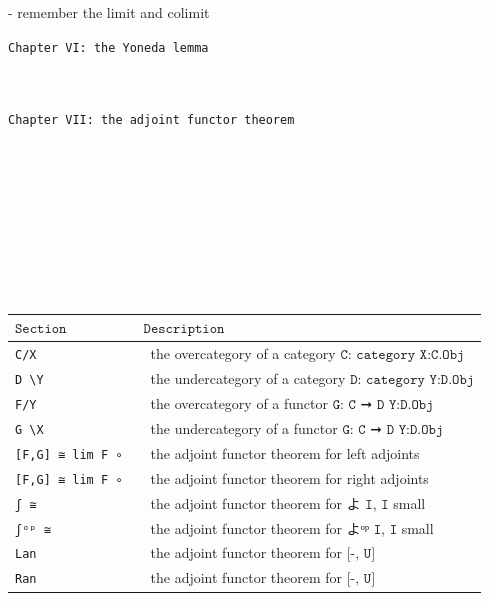 \documentclass{book}
\begin{document}
- remember the limit and colimit


\texttt{Chapter VI: the Yoneda lemma}


\newpage
{
\Huge 
\begin{center}
\ \\
\ \\
\thispagestyle{empty}
\texttt{Chapter VII: the adjoint functor theorem}
\end{center}
}

\ \\
\ \\
\ \\
\ \\
\ \\
\ \\
\ \\
\ \\

{
\small
\begin{center}
\begin{tabular}{|l | l |} 
 \hline
 $\texttt{Section}$ & $\texttt{Description}$ \\
 \hline \hline
 \hline
  \texttt{C/X}  &\ the overcategory of a category $\texttt{C: category}$ $\texttt{X:C.Obj}$\\
 \hline
   \texttt{D \backslash Y}  &\ the undercategory of a category $\texttt{D: category}$ $\texttt{Y:D.Obj}$ \\
 \hline
  \texttt{F/Y}  &\ the overcategory of a functor $\texttt{G: C ➞ D}$ $\texttt{Y:D.Obj}$ \\
 \hline
  \texttt{G \backslash X}  &\ the undercategory of a functor $\texttt{G: C ➞ D}$ $\texttt{Y:D.Obj}$ \\
 \hline
 \texttt{[F,G] ≅ lim F ∘ } &\ the adjoint functor theorem for left adjoints\\
 \hline
 \texttt{[F,G] ≅ lim F ∘ } &\ the adjoint functor theorem for right adjoints\\
 \hline
  \texttt{ʃ ≅ } &\ the adjoint functor theorem for $\texttt{よ I}$, $\texttt{I}$ small\\
 \hline
  \texttt{ʃᵒᵖ ≅ }  &\ the adjoint functor theorem for $\texttt{よᵒᵖ I}$, $\texttt{I}$ small\\
 \hline
  \texttt{Lan} &\ the adjoint functor theorem for $\texttt{[-, U]}$\\
 \hline
  \texttt{Ran}  &\ the adjoint functor theorem for $\texttt{[-, U]}$\\
 \hline
\end{tabular}
\end{center}
}
\end{document}

